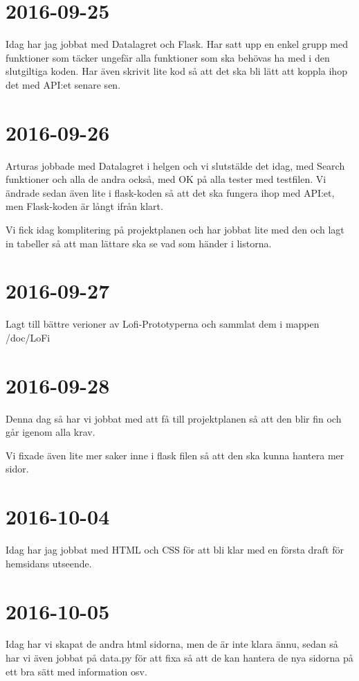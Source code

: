 \documentclass{TDP003mall}
\begin{document}
\section*{2016-09-25}
Idag har jag jobbat med Datalagret och Flask. Har satt upp en enkel grupp med funktioner som täcker ungefär alla funktioner som ska behövas ha med i den slutgiltiga koden. Har även skrivit lite kod så att det ska bli lätt att koppla ihop det med API:et senare sen.

\section*{2016-09-26}
Arturas jobbade med Datalagret i helgen och vi slutstälde det idag, med Search funktioner och alla de andra också, med OK på alla tester med testfilen. Vi ändrade sedan även lite i flask-koden så att det ska fungera ihop med API:et, men Flask-koden är långt ifrån klart.

Vi fick idag komplitering på projektplanen och har jobbat lite med den och lagt in tabeller så att man lättare ska se vad som händer i listorna.

\section*{2016-09-27}
Lagt till bättre verioner av Lofi-Prototyperna och sammlat dem i mappen /doc/LoFi

\section*{2016-09-28}
Denna dag så har vi jobbat med att få till projektplanen så att den blir fin och går igenom alla krav.

Vi fixade även lite mer saker inne i flask filen så att den ska kunna hantera mer sidor.

\section*{2016-10-04}
Idag har jag jobbat med HTML och CSS för att bli klar med en första draft för hemsidans utseende.

\section*{2016-10-05}
Idag har vi skapat de andra html sidorna, men de är inte klara ännu, sedan så har vi även jobbat på data.py för att fixa så att de kan hantera de nya sidorna på ett bra sätt med information osv.
\end{document}
